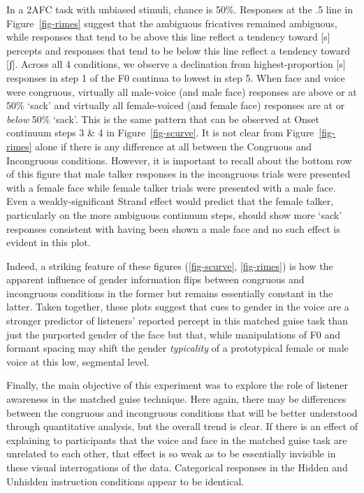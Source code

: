 \documentclass[
  letterpaper,
  DIV=11,
  numbers=noendperiod]{scrartcl}
\begin{document}
In a 2AFC task with unbiased stimuli, chance is 50\%. Responses at the
.5 line in Figure~\ref{fig-rimes} suggest that the ambiguous fricatives
remained ambiguous, while responses that tend to be above this line
reflect a tendency toward {[}s{]} percepts and responses that tend to be
below this line reflect a tendency toward {[}ʃ{]}. Across all 4
conditions, we observe a declination from highest-proportion {[}s{]}
responses in step 1 of the F0 continua to lowest in step 5. When face
and voice were congruous, virtually all male-voice (and male face)
responses are above or at 50\% `sack' and virtually all female-voiced
(and female face) responses are at or \emph{below} 50\% `sack'. This is
the same pattern that can be observed at Onset continuum steps 3 \& 4 in
Figure~\ref{fig-scurve}. It is not clear from Figure~\ref{fig-rimes}
alone if there is any difference at all between the Congruous and
Incongruous conditions. However, it is important to recall about the
bottom row of this figure that male talker responses in the incongruous
trials were presented with a female face while female talker trials were
presented with a male face. Even a weakly-significant Strand effect
would predict that the female talker, particularly on the more ambiguous
continuum steps, should show more `sack' responses consistent with
having been shown a male face and no such effect is evident in this
plot.

Indeed, a striking feature of these figures
(\ref{fig-scurve}, \ref{fig-rimes}) is how the apparent influence of
gender information flips between congruous and incongruous conditions in
the former but remains essentially constant in the latter. Taken
together, these plots suggest that cues to gender in the voice are a
stronger predictor of listeners' reported percept in this matched guise
task than just the purported gender of the face but that, while
manipulations of F0 and formant spacing may shift the gender
\emph{typicality} of a prototypical female or male voice at this low,
segmental level.

Finally, the main objective of this experiment was to explore the role
of listener awareness in the matched guise technique. Here again, there
may be differences between the congruous and incongruous conditions that
will be better understood through quantitative analysis, but the overall
trend is clear. If there is an effect of explaining to participants that
the voice and face in the matched guise task are unrelated to each
other, that effect is so weak as to be essentially invisible in these
visual interrogations of the data. Categorical responses in the Hidden
and Unhidden instruction conditions appear to be identical.
\end{document}
